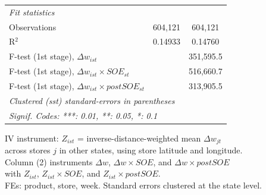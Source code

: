 \begin{table}[htbp]
\begin{tabular}{lcc}
      \midrule
      \emph{Fit statistics}\\
      Observations                                               & 604,121        & 604,121\\  
      R$^2$                                                      & 0.14933        & 0.14760\\  
      F-test (1st stage), $\Delta w_{ist}$                       &                & 351,595.5\\  
      F-test (1st stage), $\Delta w_{ist} \times SOE_{st}$       &                & 516,660.7\\  
      F-test (1st stage), $\Delta w_{ist} \times postSOE_{st}$   &                & 313,905.5\\  
      \midrule \midrule
      \multicolumn{3}{l}{\emph{Clustered (sst) standard-errors in parentheses}}\\
      \multicolumn{3}{l}{\emph{Signif. Codes: ***: 0.01, **: 0.05, *: 0.1}}\\
   \end{tabular}
   
   \par \raggedright 
   IV instrument: $Z_{ist}$ = inverse-distance-weighted mean $\Delta w_{jt}$\\
   across stores $j$ in other states, using store latitude and longitude.\\
   Column (2) instruments $\Delta w$, $\Delta w \times SOE$, and $\Delta w \times postSOE$\\
   with $Z_{ist}$, $Z_{ist} \times SOE$, and $Z_{ist} \times postSOE$.\\
   FEs: product, store, week. Standard errors clustered at the state level.
\end{table}



